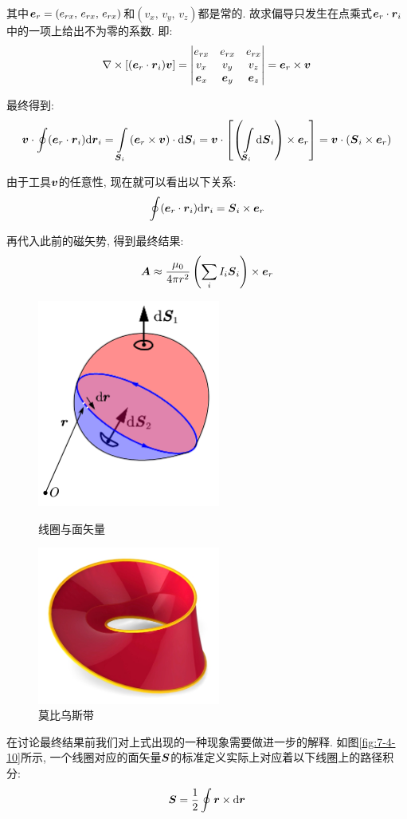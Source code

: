 其中$\boldsymbol{e}_r=(e_{rx},\,e_{rx},\,e_{rx})$和$(v_x,\,v_y,\,v_z)$都是常的. 故求偏导只发生在点乘式$\boldsymbol{e}_r\cdot \boldsymbol{r}_i$中的一项上给出不为零的系数. 即:
\[\nabla\times\left[(\boldsymbol{e}_r\cdot \boldsymbol{r}_i)\boldsymbol{v}\right]=\begin{vmatrix}
e_{rx}&e_{rx}&e_{rx}\\
v_x &v_y&v_z\\
\boldsymbol{e}_x&\boldsymbol{e}_y&\boldsymbol{e}_z
\end{vmatrix}=\boldsymbol{e}_r\times\boldsymbol{v}\]

最终得到:
\[\boldsymbol{v}\cdot\oint(\boldsymbol{e}_r\cdot \boldsymbol{r}_i)\textrm{d} \boldsymbol{r}_i=\int\limits_{\boldsymbol{S}_i}\left(\boldsymbol{e}_r\times\boldsymbol{v}\right)\cdot\textrm{d} \boldsymbol{S}_i=\boldsymbol{v}\cdot\left[\left(\int\limits_{\boldsymbol{S}_i}\textrm{d}\boldsymbol{S}_i\right)\times\boldsymbol{e}_r\right]=\boldsymbol{v}\cdot\left(\boldsymbol{S}_i\times\boldsymbol{e}_r\right)\]

由于工具$\boldsymbol{v}$的任意性, 现在就可以看出以下关系:
\[\oint(\boldsymbol{e}_r\cdot \boldsymbol{r}_i)\textrm{d} \boldsymbol{r}_i=\boldsymbol{S}_i\times\boldsymbol{e}_r\]

再代入此前的磁矢势, 得到最终结果:
\[\boldsymbol{A}\approx\frac{\mu_0}{4\pi r^2}\left(\sum_i I_i\boldsymbol{S}_i\right)\times\boldsymbol{e}_r\]

\begin{figure}
\centering
\includegraphics[width=6cm]{image/7-4-10.png}
\caption{线圈与面矢量}\label{fig:7-4-10}
\includegraphics[width=6cm]{image/7-4-11.jpg}
\caption{莫比乌斯带}\label{fig:7-4-11}
\end{figure}
在讨论最终结果前我们对上式出现的一种现象需要做进一步的解释. 如图\ref{fig:7-4-10}所示, 一个线圈对应的面矢量$\boldsymbol{S}$的标准定义实际上对应着以下线圈上的路径积分:
\[\boldsymbol{S}=\frac{1}{2}\oint\boldsymbol{r}\times \textrm{d} \boldsymbol{r}\]

